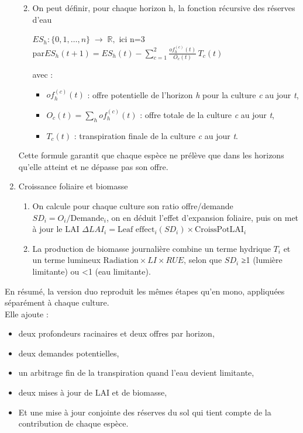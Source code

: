 \documentclass[
]{article}
\begin{document}
\begin{enumerate}
  \begin{enumerate}
  \def\labelenumii{\arabic{enumii}.}
  \item
    On peut définir, pour chaque horizon h, la fonction récursive des
    réserves d'eau

    \(ES_h : \{0,1,\dots,n\}\;\to\;\mathbb{R},\) ici n=3\\
    par\(ES_h(t+1) = ES_h(t) -\sum_{c=1}^{2}\frac{of_{h}^{(c)}(t)}{O_{c}(t)}\,T_{c}(t)\)

    avec :

    \begin{itemize}
    \item
      \(of_{h}^{(c)}(t)\) : offre potentielle de l'horizon \emph{h} pour
      la culture \emph{c} au jour \emph{t},
    \item
      \(O_{c}(t)=\sum_{h} of_{h}^{(c)}(t)\) : offre totale de la culture
      \emph{c} au jour \emph{t},
    \item
      \(T_{c}(t)\) : transpiration finale de la culture \emph{c} au jour
      \emph{t}.
    \end{itemize}
  \end{enumerate}

  Cette formule garantit que chaque espèce ne prélève que dans les
  horizons qu'elle atteint et ne dépasse pas son offre.
\item
  Croissance foliaire et biomasse

  \begin{enumerate}
  \def\labelenumii{\arabic{enumii}.}
  \item
    On calcule pour chaque culture son ratio offre/demande
    \(SD_i=O_i/\text{Demande}_i\), on en déduit l'effet d'expansion
    foliaire, puis on met à jour le LAI
    \(\Delta LAI_i = \text{Leaf effect}_i (SD_i)\times \text{CroissPotLAI}_i\)
  \item
    La production de biomasse journalière combine un terme hydrique
    \(T_i\) et un terme lumineux
    \(\text{Radiation}\times LI\times RUE\), selon que \(SD_i\) ≥1
    (lumière limitante) ou \textless1 (eau limitante).
  \end{enumerate}
\end{enumerate}

En résumé, la version duo reproduit les mêmes étapes qu'en mono,
appliquées séparément à chaque culture.\\
Elle ajoute :

\begin{itemize}
\item
  deux profondeurs racinaires et deux offres par horizon,
\item
  deux demandes potentielles,
\item
  un arbitrage fin de la transpiration quand l'eau devient limitante,
\item
  deux mises à jour de LAI et de biomasse,
\item
  Et une mise à jour conjointe des réserves du sol qui tient compte de
  la contribution de chaque espèce.
\end{itemize}
\end{document}
